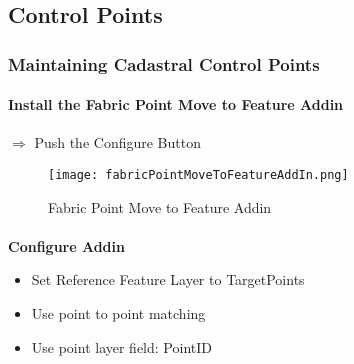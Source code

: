 %
%
%
%
% 
\subsection{Control Points}
\medskip
\subsubsection[Editing Control Points]{Maintaining Cadastral Control Points}
\vspace{.1in}

\paragraph[Fabric Point Move to Feature Addin]{\textbf{ Install the Fabric Point Move to Feature Addin}}
\vspace{.1in}

{\Large $\Rightarrow$ Push the Configure Button}

\begin{figure}[h!]
\centering
    \texttt{[image: fabricPointMoveToFeatureAddIn.png]}

\caption{Fabric Point Move to Feature Addin}
\end{figure}
%
\clearpage
\paragraph[Configure Addin]{}\textbf{\Large Configure Addin}
\vspace{.1in}

\begin{itemize}

\item Set Reference Feature Layer to TargetPoints
\item Use point to point matching
\item Use point layer field: PointID
\end{itemize}

